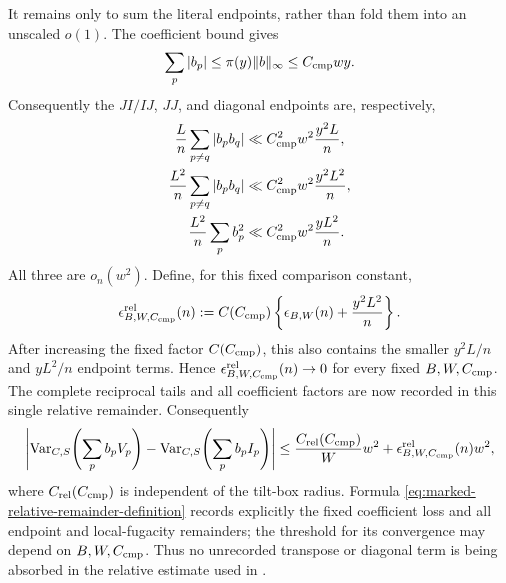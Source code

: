 \documentclass[11pt]{article}
\numberwithin{equation}{section}
\theoremstyle{definition}
\theoremstyle{remark}
\newcommand{\1}{\mathbf 1}
\begin{document}
It remains only to sum the literal endpoints, rather than fold them into
an unscaled \(o(1)\).  The coefficient bound gives
\[
 \sum_p|b_p|\le\pi(y)\|b\|_\infty\le C_{\rm cmp}wy.
\]
Consequently the \(JI/IJ\), \(JJ\), and diagonal endpoints are,
respectively,
\begin{align}
 \frac Ln\sum_{p\ne q}|b_pb_q|
 &\ll C_{\rm cmp}^2w^2\frac{y^2L}{n},\notag\\
 \frac{L^2}{n}\sum_{p\ne q}|b_pb_q|
 &\ll C_{\rm cmp}^2w^2\frac{y^2L^2}{n},\notag\\
 \frac{L^2}{n}\sum_pb_p^2
 &\ll C_{\rm cmp}^2w^2\frac{yL^2}{n}.
 \label{eq:marked-relative-endpoint-ledger}
\end{align}
All three are \(o_n(w^2)\).  Define, for this fixed comparison constant,
\begin{equation}
 \epsilon^{\rm rel}_{B,W,C_{\rm cmp}}(n)
 :=C(C_{\rm cmp})\left\{\epsilon_{B,W}(n)
             +\frac{y^2L^2}{n}\right\}.
 \label{eq:marked-relative-remainder-definition}
\end{equation}
After increasing the fixed factor \(C(C_{\rm cmp})\), this also contains
the smaller \(y^2L/n\) and \(yL^2/n\) endpoint terms.  Hence
\(\epsilon^{\rm rel}_{B,W,C_{\rm cmp}}(n)\to0\) for every fixed
\(B,W,C_{\rm cmp}\).  The complete reciprocal tails and all coefficient
factors are now recorded in this single relative remainder.
Consequently
\begin{equation}
 \left|\operatorname{Var}_{C,S}\!\left(\sum_pb_pV_p\right)
       -\operatorname{Var}_{C,S}\!\left(\sum_pb_pI_p\right)\right|
 \le \frac{C_{\rm rel}(C_{\rm cmp})}{W}w^2
       +\epsilon^{\rm rel}_{B,W,C_{\rm cmp}}(n)w^2,
 \label{eq:marked-compensated-power-relative}
\end{equation}
where \(C_{\rm rel}(C_{\rm cmp})\) is independent of the tilt-box
radius.  Formula
\eqref{eq:marked-relative-remainder-definition} records explicitly the
fixed coefficient loss and all endpoint and local-fugacity remainders;
the threshold for its convergence may depend on \(B,W,C_{\rm cmp}\).
Thus no unrecorded transpose or diagonal term is being absorbed in the
relative estimate used in .
\end{document}
